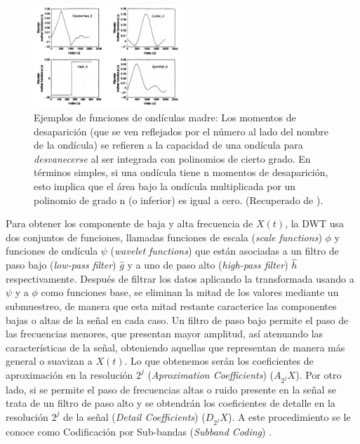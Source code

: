 \begin{figure}[H]
    \centering
    \includegraphics[width=0.5\textwidth]{Figuras/descomposicion/wavelet_mother_functions.png}
    \caption{Ejemplos de funciones de ondículas madre: Los momentos de desaparición (que se ven reflejados por el número al lado del nombre de la ondícula) se refieren a la capacidad de una ondícula para \textit{desvanecerse} al ser integrada con polinomios de cierto grado. En términos simples, si una ondícula tiene n momentos de desaparición, esto implica que el área bajo la ondícula multiplicada por un polinomio de grado n (o inferior) es igual a cero. (Recuperado de \cite{an_introduction_to_wavelets}).} 
    \label{fig:funciones_ondículas_madre}
\end{figure}

Para obtener los componente de baja y alta frecuencia de $X(t)$, la DWT usa dos conjuntos de funciones, llamadas funciones de escala (\textit{scale functions}) $\phi$ y funciones de ondícula $\psi$ (\textit{wavelet functions}) que están asociadas a un filtro de paso bajo (\textit{low-pass filter}) $\hat{g}$ y a uno de paso alto (\textit{high-pass filter}) $\hat{h}$ respectivamente. Después de filtrar los datos aplicando la transformada usando a $\psi$ y a $\phi$ como funciones base, se eliminan la mitad de los valores mediante un submuestreo, de manera que esta mitad restante caracterice las componentes bajas o altas de la señal en cada caso. Un filtro de paso bajo permite el paso de las frecuencias menores, que presentan mayor amplitud, así atenuando las características de la señal, obteniendo aquellas que representan de manera más general o suavizan a $X(t)$. Lo que obtenemos serán los coeficientes de aproximación en la resolución $2^{j}$ (\textit{Aproximation Coefficients}) ($A_{2^{j}}X$). Por otro lado, si se permite el paso de frecuencias altas o ruido presente en la señal se trata de un filtro de paso alto y se obtendrán los coeficientes de detalle en la resolución $2^{j}$ de la señal (\textit{Detail Coefficients}) ($D_{2^{j}}X$). A este procedimiento se le conoce como Codificación por Sub-bandas (\textit{Subband Coding}) \cite{wavalet_tutorial_Polizar}.


